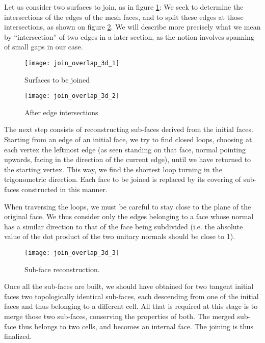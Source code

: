 Let us consider two surfaces to join, as in figure \ref{fig:algo.join.curv}:
We seek to determine the intersections of the edges of the mesh faces,
and to split these edges at those intersections, as shown on figure
\ref{fig:algo.join.curv2}. We will describe more precisely what we
mean by ``intersection'' of two edges in a later section, as
the notion involves spanning of small gaps in our case.

\begin{figure}[!h]
\centerline{
\texttt{[image: join\_overlap\_3d\_1]}}
\caption{Surfaces to be joined}
\label{fig:algo.join.curv}
\end{figure}

\begin{figure}[!h]
\centerline{
\texttt{[image: join\_overlap\_3d\_2]}}
\caption{After edge intersections}
\label{fig:algo.join.curv2}
\end{figure}

The next step consists of reconstructing sub-faces derived from the
initial faces. Starting from an edge of an initial face, we try to find
closed loops, choosing at each vertex the leftmost edge (as seen standing
on that face, normal pointing upwards, facing in the direction of the
current edge), until we have returned to the starting vertex. This way,
we find the shortest loop turning in the trigonometric
direction. Each face to be joined is replaced by its covering of
sub-faces constructed in this manner.

When traversing the loops, we must be careful to stay close to the plane
of the original face. We thus consider only the edges belonging to a face
whose normal has a similar direction to that of the face being subdivided
(i.e. the absolute value of the dot product of the two unitary normals
should be close to 1).

\begin{figure}[!h]
\centerline{
\texttt{[image: join\_overlap\_3d\_3]}}
\caption{Sub-face reconstruction.}
\label{fig:algo.join.curv3}
\end{figure}

Once all the sub-faces are built, we should have obtained for two tangent
initial faces two topologically identical sub-faces, each descending
from one of the initial faces and thus belonging to a different cell.
All that is required at this stage is to merge those two sub-faces,
conserving the properties of both. The merged sub-face thus belongs to
two cells, and becomes an internal face. The joining is thus finalized.

